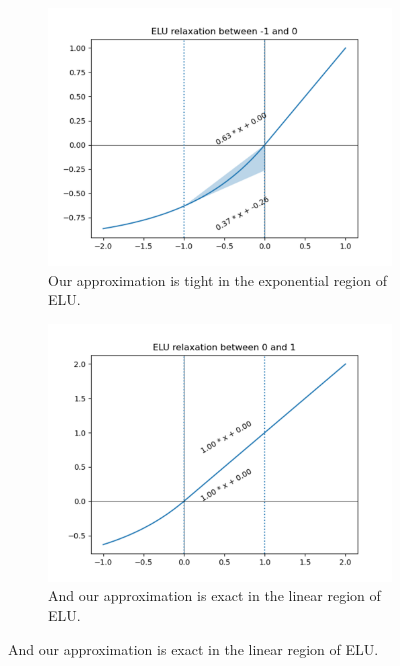 \documentclass{llncs}
\begin{document}
\begin{figure}[t]
    \centering
    \begin{subfigure}{.48\textwidth}
        \centering
        \includegraphics[width=\linewidth]{elu_exponential_relaxation.png}
        \caption{Our approximation is tight in the exponential region of ELU.}
        \label{fig:elu_exp_relax}
    \end{subfigure}
    \quad
    \begin{subfigure}{.48\textwidth}
        \centering
        \includegraphics[width=\linewidth]{elu_linear_relaxation.png}
        \caption{And our approximation is exact in the linear region of ELU.}
        \label{fig:elu_linear_relax}
    \end{subfigure}

\end{figure}
\end{document}

